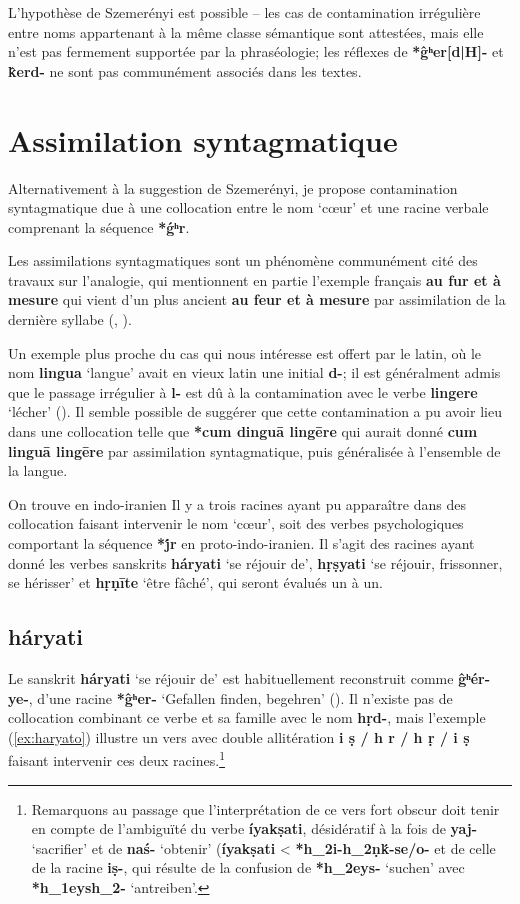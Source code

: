 \documentclass{article}
\newcommand{\ipa}[1]{{\phon\textbf{#1}}}
\begin{document}
L'hypothèse de Szemerényi est possible -- les cas de contamination irrégulière entre noms appartenant à la même classe sémantique sont attestées, mais elle n'est pas fermement supportée par la phraséologie; les réflexes de \ipa{*ĝʰer[d|H]-} et \ipa{k̂erd-} ne sont pas communément associés dans les textes.

\section{Assimilation syntagmatique}
Alternativement à la suggestion de Szemerényi, je propose  contamination syntagmatique due à une collocation entre le nom `cœur' et une racine verbale comprenant la séquence \ipa{*ǵʰr}. 

Les assimilations syntagmatiques sont un phénomène communément cité des travaux sur l'analogie, qui mentionnent en partie l'exemple français \ipa{au fur et à mesure} qui vient d'un plus ancient \ipa{au feur et à mesure } par assimilation de la dernière syllabe (\citealt[16]{andersen80morpho}, \citet[64]{fertig13analogy}). %

Un exemple plus proche du cas qui nous intéresse est offert par le latin, où le nom \ipa{lingua} `langue' avait en vieux latin une initial \ipa{d-}; il est généralment admis que le passage irrégulier à \ipa{l-} est dû à la contamination avec le verbe \ipa{lingere} `lécher' (\citealt[304]{hock91principles}). Il semble possible de suggérer que cette contamination a pu avoir lieu dans une collocation telle que \ipa{*cum dinguā lingēre} qui aurait donné \ipa{cum linguā lingēre} par assimilation syntagmatique, puis généralisée à l'ensemble de la langue.
 
On trouve en indo-iranien Il y a trois racines ayant pu apparaître dans des collocation faisant intervenir le nom `cœur', soit des verbes psychologiques comportant la séquence \ipa{*j́r} en proto-indo-iranien. Il s'agit des racines ayant donné les verbes sanskrits \ipa{háryati} `se réjouir de', \ipa{hṛṣyati} `se réjouir, frissonner, se hérisser' et \ipa{hṛṇīte} `être fâché', qui seront évalués un à un.

\subsection{\ipa{háryati}} \label{sec:haryati}

Le sanskrit \ipa{háryati} `se réjouir de' est habituellement reconstruit comme \ipa{ĝʰér-ye-}, d'une racine \ipa{*ĝʰer-} `Gefallen finden, begehren' (\citealt[176]{liv}). Il n'existe pas de collocation combinant ce verbe et sa famille avec le nom \ipa{hṛd-}, mais l'exemple (\ref{ex:haryato}) illustre un vers avec double allitération \ipa{i ṣ / h r / h ṛ / i ṣ} faisant intervenir ces deux racines.\footnote{Remarquons au passage que l'interprétation de ce vers fort obscur doit tenir en compte de l'ambiguïté du verbe \ipa{íyakṣati}, désidératif à la fois de \ipa{yaj-} `sacrifier' et de \ipa{naś-} `obtenir' (\ipa{íyakṣati} < \ipa{*h_2i-h_2ṇḱ-se/o-} et de celle de la racine \ipa{iṣ-}, qui résulte de la confusion de \ipa{*h_2eys-} `suchen' avec \ipa{*h_1eysh_2-} `antreiben'. }
\end{document}
